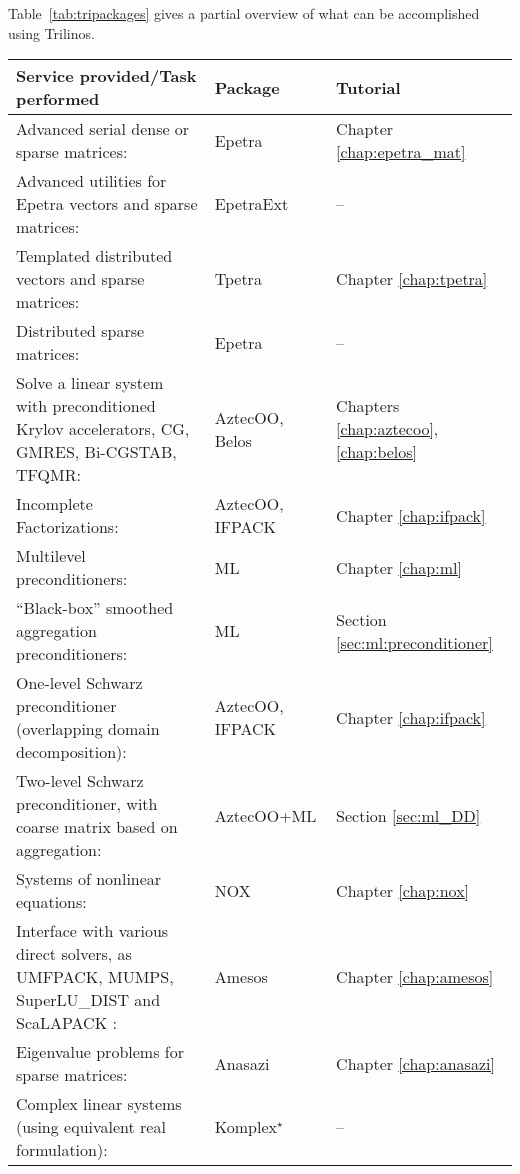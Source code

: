 Table~\ref{tab:tripackages} gives a partial overview of what can be
accomplished using Trilinos.
\begin{table}[htbp]
  \centering
  \begin{tabular}{| p{8cm} | p{2.5cm} | p{3cm} |}
    \hline
    {\bf Service provided/Task performed} & {\bf Package} & {\bf Tutorial}\\
    \hline
    \hline
    Advanced serial dense or sparse matrices: & Epetra
    & Chapter \ref{chap:epetra_mat} \\
    Advanced utilities for Epetra vectors and sparse matrices: &
    EpetraExt & --
    \\
    \hline
    Templated distributed vectors and sparse matrices: & Tpetra
    & Chapter \ref{chap:tpetra} \\
    \hline
    Distributed sparse matrices:& Epetra & -- \\
    \hline
    Solve a linear system with preconditioned Krylov accelerators,
    CG, GMRES, Bi-CGSTAB, TFQMR:& AztecOO, Belos &
    Chapters \ref{chap:aztecoo}, \ref{chap:belos} \\
    \hline
    Incomplete Factorizations:& AztecOO, \newline IFPACK &
    Chapter \ref{chap:ifpack} \\
    \hline
    Multilevel  preconditioners: & ML & Chapter \ref{chap:ml} \\
    \hline
    ``Black-box'' smoothed aggregation preconditioners:& ML & Section
    \ref{sec:ml:preconditioner} \\
    \hline
    One-level Schwarz preconditioner (overlapping domain
    decomposition):& AztecOO, \newline IFPACK & Chapter
    \ref{chap:ifpack} \\
    \hline
    Two-level Schwarz preconditioner, with coarse matrix based on
    aggregation:& AztecOO+ML & Section \ref{sec:ml_DD} \\
    \hline
    Systems of nonlinear equations:& NOX & Chapter \ref{chap:nox} \\
    \hline
    Interface with various direct solvers, as UMFPACK, MUMPS, SuperLU\_DIST
    and ScaLAPACK :& Amesos & Chapter \ref{chap:amesos} \\
    \hline
    Eigenvalue problems for sparse matrices:& Anasazi & Chapter
    \ref{chap:anasazi} \\
    \hline
    Complex linear systems (using equivalent real formulation):&
    Komplex$^\star$ & -- \\
    \hline

\end{tabular}
\end{table}
